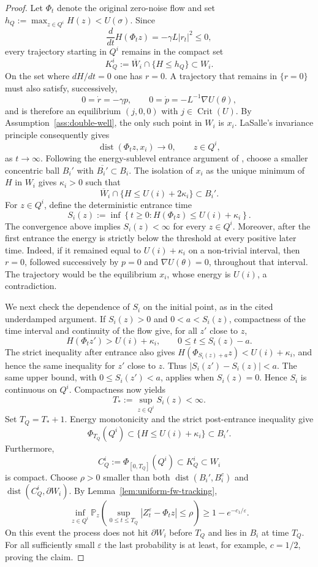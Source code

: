 \documentclass[11pt]{article}
\numberwithin{equation}{section}
\theoremstyle{plain}
\theoremstyle{definition}
\theoremstyle{remark}
\newcommand{\eps}{\varepsilon}
\newcommand{\Pbb}{\mathbb P}
\begin{document}
\begin{proof}
Let $\Phi_t$ denote the original zero-noise flow and set
$h_Q:=\max_{z\in Q^i}H(z)<U(\sigma)$.  Since
\[
\frac{d}{dt}H(\Phi_tz)=-\gamma L|r_t|^2\le0,
\]
every trajectory starting in $Q^i$ remains in the compact set
\[
K_Q^i:=\overline W_i\cap\{H\le h_Q\}\subset W_i.
\]
On the set where $dH/dt=0$ one has $r=0$.  A trajectory that remains in
$\{r=0\}$ must also satisfy, successively,
\[
0=\dot r=-\gamma p,
\qquad
0=\dot p=-L^{-1}\nabla U(\theta),
\]
and is therefore an equilibrium $(j,0,0)$ with $j\in\operatorname{Crit}(U)$.
By Assumption~\ref{ass:double-well}, the only such point in
$W_i$ is $x_i$.  LaSalle's invariance principle consequently gives
\[
\operatorname{dist}(\Phi_tz,x_i)\longrightarrow0
,\qquad z\in Q^i,
\]
as $t\rightarrow\infty$.
Following the energy-sublevel entrance argument of
\cite[Lemmas~10.3--10.4]{LeeRamilSeo2026}, choose a smaller concentric ball
$B_i'$ with $\overline{B_i'}\subset B_i$.  The isolation of $x_i$ as the
unique minimum of $H$ in $W_i$ gives $\kappa_i>0$ such that
\[
\overline W_i\cap\{H\le U(i)+2\kappa_i\}\subset B_i'.
\]
For $z\in Q^i$, define the deterministic entrance time
\[
S_i(z):=\inf\left\{t\ge0:
H(\Phi_tz)\le U(i)+\kappa_i\right\}.
\]
The convergence above implies $S_i(z)<\infty$ for every $z\in Q^i$.
Moreover, after the first entrance the energy is strictly below the threshold
at every positive later time.  Indeed, if it remained equal to
$U(i)+\kappa_i$ on a non-trivial interval, then
$r=0$, followed successively by $p=0$ and $\nabla U(\theta)=0$, throughout
that interval.  The trajectory would be the equilibrium $x_i$, whose energy
is $U(i)$, a contradiction.

We next check the dependence of $S_i$ on the initial point, as in the cited
underdamped argument.  If $S_i(z)>0$ and $0<a<S_i(z)$, compactness of the
time interval and continuity of the flow give, for all $z'$ close to $z$,
\[
H(\Phi_tz')>U(i)+\kappa_i,
\qquad 0\le t\le S_i(z)-a.
\]
The strict inequality after entrance also gives
$H(\Phi_{S_i(z)+a}z)<U(i)+\kappa_i$, and hence the same inequality for
$z'$ close to $z$.  Thus
$|S_i(z')-S_i(z)|<a$.  The same upper bound, with
$0\le S_i(z')<a$, applies when $S_i(z)=0$.  Hence $S_i$ is continuous on
$Q^i$.  Compactness now yields
\[
T_*:=\sup_{z\in Q^i}S_i(z)<\infty.
\]
Set $T_Q=T_*+1$.  Energy monotonicity and the strict post-entrance inequality
give
\[
\Phi_{T_Q}(Q^i)\subset
\{H\le U(i)+\kappa_i\}\subset B_i'.
\]
Furthermore,
\[
C_Q^i:=\Phi_{[0,T_Q]}(Q^i)
\subset K_Q^i\subset W_i
\]
is compact.
Choose $\rho>0$ smaller than both
$\operatorname{dist}(B_i',B_i^c)$ and
$\operatorname{dist}(C_Q^i,\partial W_i)$.  By
Lemma~\ref{lem:uniform-fw-tracking},
\[
\inf_{z\in Q^i}
\Pbb_z\left(
\sup_{0\le t\le T_Q}|Z_t^\eps-\Phi_tz|\le\rho
\right)
\ge1-e^{-c_1/\eps}.
\]
On this event the process does not hit $\partial W_i$ before $T_Q$ and lies
in $B_i$ at time $T_Q$.  For all sufficiently small $\eps$ the last
probability is at least, for example, $c=1/2$, proving the claim.
\end{proof}
\end{document}
